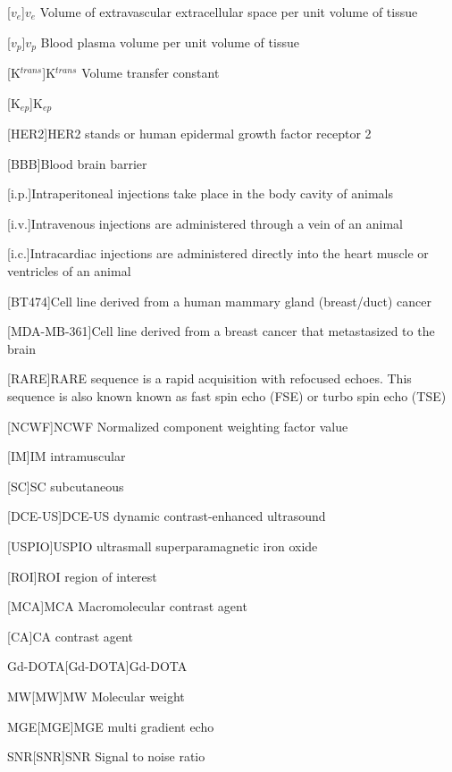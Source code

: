 \begin{acronym}
[$v_e$]{$v_e$ Volume of extravascular extracellular space per unit volume of tissue}

[$v_p$]{$v_p$ Blood plasma volume per unit volume of tissue}

[K$^{trans}$]{K$^{trans}$ Volume transfer constant}

[K$_{ep}$]{K$_{ep}$}

[HER2]{HER2 stands or human epidermal growth factor receptor 2}

[BBB]{Blood brain barrier}

[i.p.]{Intraperitoneal injections take place in the body cavity of animals}

[i.v.]{Intravenous injections are administered through a vein of an animal}

[i.c.]{Intracardiac injections are administered directly into the heart muscle or ventricles of an animal}

[BT474]{Cell line derived from a human mammary gland (breast/duct) cancer}

[MDA-MB-361]{Cell line derived from a breast cancer that metastasized to the brain}

[RARE]{RARE sequence is a rapid acquisition with refocused echoes. This sequence is also known known as fast spin echo (FSE) or turbo spin echo (TSE)}

[NCWF]{NCWF Normalized component weighting factor value}

[IM]{IM intramuscular}

[SC]{SC subcutaneous}

[DCE-US]{DCE-US dynamic contrast-enhanced ultrasound}

[USPIO]{USPIO ultrasmall superparamagnetic iron oxide}

[ROI]{ROI region of interest}

[MCA]{MCA Macromolecular contrast agent}

[CA]{CA contrast agent}

\acs{Gd-DOTA}[Gd-DOTA]{Gd-DOTA}

\acs{MW}[MW]{MW Molecular weight}

\acs{MGE}[MGE]{MGE multi gradient echo}

\acs{SNR}[SNR]{SNR Signal to noise ratio}

\end{acronym}

